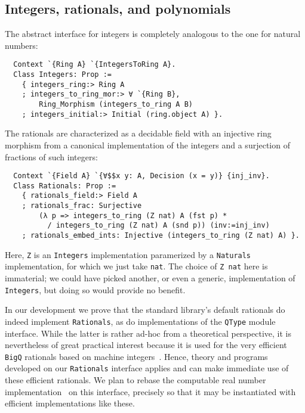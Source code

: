 \documentclass[a4paper,10pt,runningheads]{llncs}
\begin{document}
\subsection{Integers, rationals, and polynomials}

The abstract interface for integers is completely analogous to the one for natural numbers:
\begin{lstlisting}
  Context `{Ring A} `{IntegersToRing A}.
  Class Integers: Prop :=
    { integers_ring:> Ring A
    ; integers_to_ring_mor:> ∀ `{Ring B},
        Ring_Morphism (integers_to_ring A B)
    ; integers_initial:> Initial (ring.object A) }.
\end{lstlisting}

The rationals are characterized as a decidable field with an injective ring morphism from a canonical implementation of the integers and a surjection of fractions of such integers:
\begin{lstlisting}
  Context `{Field A} `{∀$$x y: A, Decision (x = y)} {inj_inv}.
  Class Rationals: Prop :=
    { rationals_field:> Field A
    ; rationals_frac: Surjective
        (λ p => integers_to_ring (Z nat) A (fst p) *
          / integers_to_ring (Z nat) A (snd p)) (inv:=inj_inv)
    ; rationals_embed_ints: Injective (integers_to_ring (Z nat) A) }.
\end{lstlisting}
Here, \lstinline|Z| is an \lstinline|Integers| implementation paramerized by a \lstinline|Naturals| implementation, for which we just take \lstinline|nat|. The choice of \lstinline|Z nat| here is immaterial; we could have picked another, or even a generic, implementation of \lstinline|Integers|, but doing so would provide no benefit.


In our development we prove that the standard library's default rationals do indeed implement \lstinline|Rationals|, as do implementations of the \lstinline|QType| module interface. While the latter is rather ad-hoc from a theoretical perspective, it is nevertheless of great practical interest because it is used for the very efficient \lstinline|BigQ| rationals based on machine integers~\cite{machineintegers}. Hence, theory and programs developed on our \lstinline|Rationals| interface applies and can make immediate use of these efficient rationals. We plan to rebase the computable real number implementation~\cite{Oconnor:real} on this interface, precisely so that it may be instantiated with efficient implementations like these.
\end{document}
